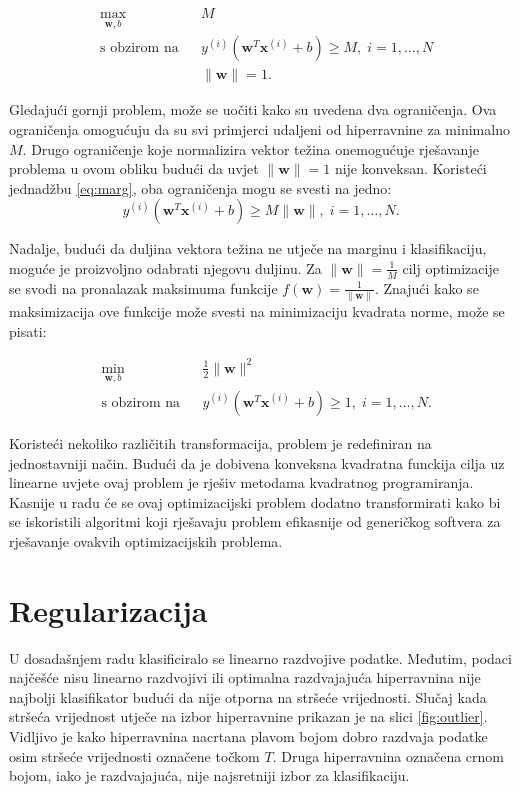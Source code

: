 \documentclass[times, utf8, zavrsni, numeric]{fer}
\begin{document}
\begin{equation}
\begin{aligned}
& \underset{\mathbf{w}, b}{\text{max}}
& & M \\
& \text{s obzirom na}
& & y^{(i)}(\mathbf{w}^T\mathbf{x}^{(i)} + b) \geq M, \; i = 1, \ldots, N \\
&&& \|\mathbf{w}\|=1.
\end{aligned}
\end{equation}

\par Gledajući gornji problem, može se uočiti kako su uvedena dva ograničenja. 
Ova ograničenja omogućuju da su svi primjerci udaljeni od hiperravnine za minimalno $M$.
Drugo ograničenje koje normalizira vektor težina onemogućuje rješavanje problema u ovom obliku budući da
uvjet $\|\mathbf{w}\|=1$ nije konveksan. Koristeći jednadžbu \ref{eq:marg}, oba ograničenja mogu se svesti
na jedno: 
\begin{equation*}
  y^{(i)}(\mathbf{w}^T\mathbf{x}^{(i)} + b) \geq M\|\mathbf{w}\|, \; i = 1, \ldots, N.
\end{equation*}

Nadalje, budući da duljina vektora težina ne utječe na marginu i klasifikaciju, moguće je proizvoljno odabrati
njegovu duljinu.
Za $\|\mathbf{w}\|=\frac{1}{M}$ cilj optimizacije se svodi na pronalazak maksimuma funkcije 
$f(\mathbf{w}) = \frac{1}{\|\mathbf{w}\|}$. Znajući kako se maksimizacija ove funkcije može svesti na 
minimizaciju kvadrata norme, može se pisati:

\begin{equation}
\begin{aligned}
& \underset{\mathbf{w}, b}{\text{min}}
& & \frac{1}{2}\|\mathbf{w}\|^2 \\
& \text{s obzirom na}
& & y^{(i)}(\mathbf{w}^T\mathbf{x}^{(i)} + b) \geq 1, \; i = 1, \ldots, N.
\end{aligned}
\end{equation}

\par Koristeći nekoliko različitih transformacija, problem je redefiniran na jednostavniji način.
Budući da je dobivena konveksna kvadratna funckija cilja uz linearne uvjete ovaj problem je rješiv
metodama kvadratnog programiranja. Kasnije u radu će se ovaj optimizacijski problem dodatno transformirati
kako bi se iskoristili algoritmi koji rješavaju problem efikasnije od generičkog softvera za 
rješavanje ovakvih optimizacijskih problema. 

\section{Regularizacija} \label{reg}
U dosadašnjem radu klasificiralo se linearno razdvojive podatke. 
Međutim, podaci najčešće nisu linearno razdvojivi ili optimalna razdvajajuća hiperravnina nije najbolji
klasifikator budući da nije otporna na stršeće vrijednosti.
Slučaj kada stršeća vrijednost utječe na izbor hiperravnine prikazan je na slici \ref{fig:outlier}.
Vidljivo je kako hiperravnina nacrtana plavom bojom dobro razdvaja podatke osim stršeće vrijednosti 
označene točkom $T$. Druga hiperravnina označena crnom bojom, iako je razdvajajuća, nije 
najsretniji izbor za klasifikaciju.
\end{document}
